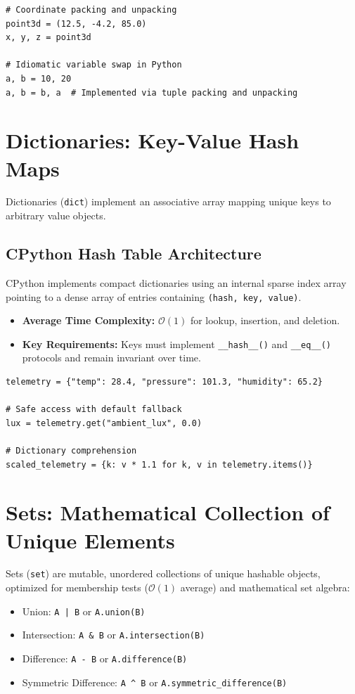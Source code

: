 \begin{lstlisting}[caption={Tuple Packing, Unpacking, and Swapping}]
# Coordinate packing and unpacking
point3d = (12.5, -4.2, 85.0)
x, y, z = point3d

# Idiomatic variable swap in Python
a, b = 10, 20
a, b = b, a  # Implemented via tuple packing and unpacking
\end{lstlisting}

\section{Dictionaries: Key-Value Hash Maps}

Dictionaries (\texttt{dict}) implement an associative array mapping unique keys to arbitrary value objects.

\subsection{CPython Hash Table Architecture}
CPython implements compact dictionaries using an internal sparse index array pointing to a dense array of entries containing \texttt{(hash, key, value)}.
\begin{itemize}[leftmargin=1.8em, itemsep=2pt]
    \item \textbf{Average Time Complexity:} $\mathcal{O}(1)$ for lookup, insertion, and deletion.
    \item \textbf{Key Requirements:} Keys must implement \texttt{\_\_hash\_\_()} and \texttt{\_\_eq\_\_()} protocols and remain invariant over time.
\end{itemize}

\begin{lstlisting}[caption={Dictionary Manipulation and Frequency Counter}]
telemetry = {"temp": 28.4, "pressure": 101.3, "humidity": 65.2}

# Safe access with default fallback
lux = telemetry.get("ambient_lux", 0.0)

# Dictionary comprehension
scaled_telemetry = {k: v * 1.1 for k, v in telemetry.items()}
\end{lstlisting}

\section{Sets: Mathematical Collection of Unique Elements}

Sets (\texttt{set}) are mutable, unordered collections of unique hashable objects, optimized for membership tests ($\mathcal{O}(1)$ average) and mathematical set algebra:
\begin{itemize}[leftmargin=1.8em, itemsep=2pt]
    \item Union: \texttt{A | B} or \texttt{A.union(B)}
    \item Intersection: \texttt{A \& B} or \texttt{A.intersection(B)}
    \item Difference: \texttt{A - B} or \texttt{A.difference(B)}
    \item Symmetric Difference: \texttt{A \^{} B} or \texttt{A.symmetric\_difference(B)}
\end{itemize}

